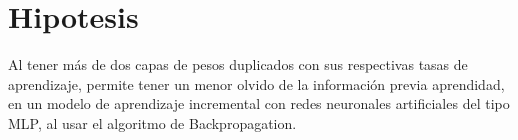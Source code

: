 \section{Hipotesis}
    Al tener m\'as de dos capas de pesos duplicados con sus respectivas tasas de aprendizaje, permite tener un menor olvido de la información previa aprendidad, en un modelo de aprendizaje incremental con redes neuronales artificiales del tipo MLP, al usar el algoritmo de Backpropagation.  
